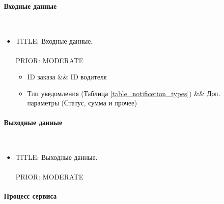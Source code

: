 	\paragraph{Входные данные} \mbox{} \\ \label{}

      \begin{itemize}

        \item{

          TITLE: Входные данные.\\
          \\
          PRIOR: MODERATE\\

        }

        \begin{itemize}
          \item ID заказа \&\& ID водителя 
          \item Тип уведомления (Таблица \ref{table_notificetion_types}) \&\& Доп. параметры (Статус, сумма и прочее)
        \end{itemize}

      \end{itemize}

  \paragraph{Выходные данные} \mbox{} \\

      \begin{itemize}

        \item{

          TITLE: Выходные данные.\\
          \\
          PRIOR: MODERATE\\

        }

      \end{itemize}

  \paragraph{Процесс сервиса} \mbox{} \\

